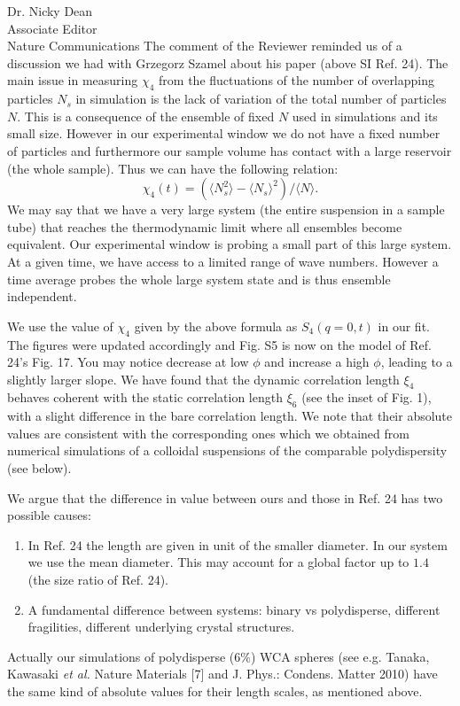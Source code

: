 \documentclass[a4paper, rebuttal, parskip=true, firsthead=false, fromemail=true, foldmarks=false]{scrlttr2}
\begin{document}
\begin{letter}{Dr. Nicky Dean\\
Associate Editor\\
Nature Communications}
The comment of the Reviewer reminded us of a discussion we had with Grzegorz Szamel about his paper (above SI Ref. 24). The main issue in measuring $\chi_4$ from the fluctuations of the number of overlapping particles $N_s$ in simulation is the lack of variation of the total number of particles $N$. This is a consequence of the ensemble of fixed $N$ used in simulations and its small size. However in our experimental window we do not have a fixed number of particles and furthermore our sample volume has contact with a large reservoir 
(the whole sample). Thus we can have the following relation:
\[
\chi_4(t) = (\langle N_s^2\rangle - \langle N_s\rangle^2) /  \langle N\rangle. 
\]
We may say that we have a very large system (the entire suspension in a sample tube) that reaches the thermodynamic limit where all ensembles become equivalent. Our experimental window is probing a small part of this large system. At a given time, we have access to a limited range of wave numbers. However a time average probes the whole large system state and is thus ensemble independent.

We use the value of $\chi_4$ given by the above formula as $S_4(q=0,t)$ in our fit. The figures were updated accordingly and Fig. S5 is now on the model of Ref. 24's Fig. 17. You may notice decrease at low $\phi$ and increase a high $\phi$, leading to a slightly larger slope. 
We have found that the dynamic correlation length $\xi_4$ behaves coherent with the static correlation length $\xi_6$ (see the inset of Fig. 1), 
with a slight difference in the bare correlation length. 
We note that their absolute values are consistent with the corresponding ones which we obtained 
from numerical simulations of a colloidal suspensions of the comparable polydispersity (see below). 

We argue that the difference in value between ours and those in Ref. 24 has two possible causes:
\begin{enumerate}
\item In Ref. 24 the length are given in unit of the smaller diameter. In our system we use the mean diameter. This may account for a global factor up to $1.4$ (the size ratio of Ref. 24).
\item A fundamental difference between systems: binary vs polydisperse, different fragilities, different underlying crystal structures.
\end{enumerate} 
Actually our simulations of polydisperse ($6\%$) WCA spheres (see e.g. Tanaka, Kawasaki \emph{et al.} Nature Materials [7] and J. Phys.: Condens. Matter 2010) have the same kind of absolute values for their length scales, as mentioned above.


\end{letter}
\end{document}
